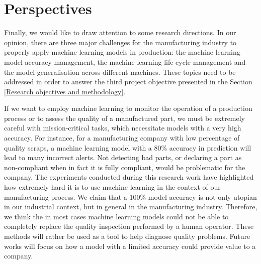\section*{Perspectives}

Finally, we would like to draw attention to some research directions. In our opinion, there are three major challenges for the manufacturing industry to properly apply machine learning models in production: the machine learning model accuracy management, the machine learning life-cycle management and the model generalisation across different machines. These topics need to be addressed in order to answer the third project objective presented in the Section \ref{Research objectives and methodology}.

If we want to employ machine learning to monitor the operation of a production process or to assess the quality of a manufactured part, we must be extremely careful with mission-critical tasks, which necessitate models with a very high accuracy. For instance, for a manufacturing company with low percentage of quality scraps, a machine learning model with a 80\% accuracy in prediction will lead to many incorrect alerts. Not detecting bad parts, or declaring a part as non-compliant when in fact it is fully compliant, would be problematic for the company. The experiments conducted during this research work have highlighted how extremely hard it is to use machine learning in the context of our manufacturing process. We claim that a 100\% model accuracy is not only utopian in our industrial context, but in general in the manufacturing industry. Therefore, we think the in most cases machine learning models could not be able to completely replace the quality inspection performed by a human operator. These methods will rather be used as a tool to help diagnose quality problems. Future works will focus on how a model with a limited accuracy could provide value to a company.

